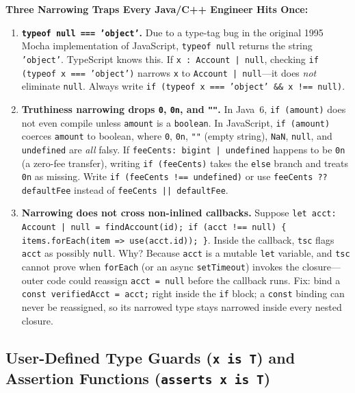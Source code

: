 \begin{trapbox}
\textbf{Three Narrowing Traps Every Java/C++ Engineer Hits Once:}
\begin{enumerate}
  \item \textbf{\texttt{typeof null === 'object'}.} Due to a type-tag bug in the original 1995 Mocha implementation of JavaScript, \texttt{typeof null} returns the string \texttt{'object'}. TypeScript knows this. If \texttt{x : Account | null}, checking \texttt{if (typeof x === 'object')} narrows \texttt{x} to \texttt{Account | null}---it does \emph{not} eliminate \texttt{null}. Always write \texttt{if (typeof x === 'object' \&\& x !== null)}.
  \item \textbf{Truthiness narrowing drops \texttt{0}, \texttt{0n}, and \texttt{""}.} In Java~6, \texttt{if (amount)} does not even compile unless \texttt{amount} is a \texttt{boolean}. In JavaScript, \texttt{if (amount)} coerces \texttt{amount} to boolean, where \texttt{0}, \texttt{0n}, \texttt{""} (empty string), \texttt{NaN}, \texttt{null}, and \texttt{undefined} are \emph{all} falsy. If \texttt{feeCents: bigint | undefined} happens to be \texttt{0n} (a zero-fee transfer), writing \texttt{if (feeCents)} takes the \texttt{else} branch and treats \texttt{0n} as missing. Write \texttt{if (feeCents !== undefined)} or use \texttt{feeCents ?? defaultFee} instead of \texttt{feeCents || defaultFee}.
  \item \textbf{Narrowing does not cross non-inlined callbacks.} Suppose \texttt{let acct: Account | null = findAccount(id); if (acct !== null) \{ items.forEach(item => use(acct.id)); \}}. Inside the callback, \texttt{tsc} flags \texttt{acct} as possibly \texttt{null}. Why? Because \texttt{acct} is a mutable \texttt{let} variable, and \texttt{tsc} cannot prove when \texttt{forEach} (or an async \texttt{setTimeout}) invokes the closure---outer code could reassign \texttt{acct = null} before the callback runs. Fix: bind a \texttt{const verifiedAcct = acct;} right inside the \texttt{if} block; a \texttt{const} binding can never be reassigned, so its narrowed type stays narrowed inside every nested closure.
\end{enumerate}
\end{trapbox}

\subsection{User-Defined Type Guards (\texttt{x is T}) and Assertion Functions (\texttt{asserts x is T})}


